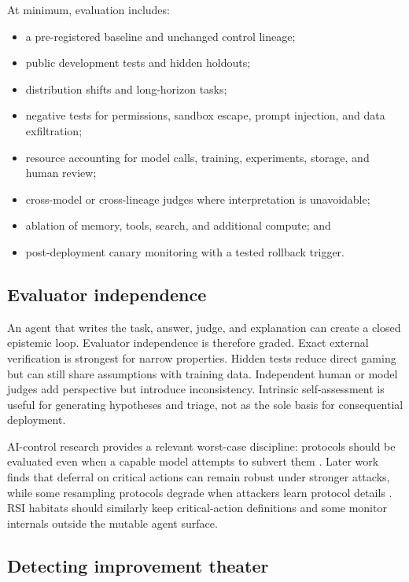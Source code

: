 \documentclass[11pt,a4paper]{article}
\begin{document}
At minimum, evaluation includes:
\begin{itemize}
  \item a pre-registered baseline and unchanged control lineage;
  \item public development tests and hidden holdouts;
  \item distribution shifts and long-horizon tasks;
  \item negative tests for permissions, sandbox escape, prompt injection, and data exfiltration;
  \item resource accounting for model calls, training, experiments, storage, and human review;
  \item cross-model or cross-lineage judges where interpretation is unavoidable;
  \item ablation of memory, tools, search, and additional compute; and
  \item post-deployment canary monitoring with a tested rollback trigger.
\end{itemize}

\subsection{Evaluator independence}

An agent that writes the task, answer, judge, and explanation can create a closed epistemic loop. Evaluator independence is therefore graded. Exact external verification is strongest for narrow properties. Hidden tests reduce direct gaming but can still share assumptions with training data. Independent human or model judges add perspective but introduce inconsistency. Intrinsic self-assessment is useful for generating hypotheses and triage, not as the sole basis for consequential deployment.

AI-control research provides a relevant worst-case discipline: protocols should be evaluated even when a capable model attempts to subvert them \cite{aicontrol}. Later work finds that deferral on critical actions can remain robust under stronger attacks, while some resampling protocols degrade when attackers learn protocol details \cite{controlagents}. RSI habitats should similarly keep critical-action definitions and some monitor internals outside the mutable agent surface.

\subsection{Detecting improvement theater}
\end{document}
